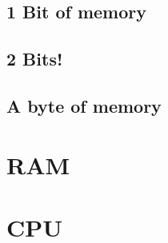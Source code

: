 \documentclass[a4paper, 12pt]{article}
\begin{document}
\subsection{1 Bit of memory}
\subsection{2 Bits!}
\subsection{A byte of memory}

\section{RAM}

\section{CPU}

\end{document}
